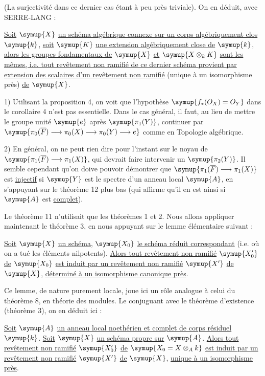 (La surjectivité dans ce dernier cas étant à peu près triviale). On en déduit,
avec SERRE-LANG :

 \uline{Soit} $\symup{X}$ \uline{un schéma algébrique connexe sur un corps
algébriquement clos} $\symup{k}$, \uline{soit} $\symup{K}$ \uline{une extension algébriquement close de} $\symup{k}$,
\uline{alors les groupes fondamentaux de} $\symup{X}$ \uline{et} $\symup{X\otimes_kK}$ \uline{sont les mêmes, i.e.
tout revêtement non ramifié de ce dernier schéma provient par extension des
scalaires d'un revêtement non ramifié} (unique à un isomorphisme près) \uline{de} $\symup{X}$.


1) Utilisant la proposition 4, on voit que l'hypothèse
$\symup{f_*(O_X)=O_Y}$ dans le corollaire 4 n'est pas essentielle. Dans le cas
général, il faut, au lieu de mettre le groupe unité $\symup{e}$ après $\symup{\pi_1(Y)}$,
continuer par
$\symup{\pi_0(\overline F)\longrightarrow\pi_0(X)
  \longrightarrow\pi_0(Y)\longrightarrow e}$
comme en Topologie algébrique.

2) En général, on ne peut rien dire pour l'instant sur le noyau de
$\symup{\pi_1(\overline F)\longrightarrow\pi_1(X)}$, qui devrait faire intervenir un
$\symup{\pi_2(Y)}$. Il semble cependant qu'on doive pouvoir démontrer que
$\symup{\pi_1(\overline F)\longrightarrow\pi_1(X)}$ est \uline{injectif} si $\symup{Y}$ est le spectre
d'un anneau local $\symup{A}$, en s'appuyant sur le théorème 12 plus bas (qui affirme
qu'il en est ainsi si $\symup{A}$ est \uline{complet}).

Le théorème 11 n'utilisait que les théorèmes 1 et 2. Nous allons appliquer
maintenant le théorème 3, en nous appuyant sur le lemme élémentaire suivant :

 \uline{Soit} $\symup{X}$ \uline{un schéma}, $\symup{X_0}$ \uline{le schéma réduit correspondant}
(i.e. où on a tué les éléments nilpotents). \uline{Alors tout revêtement non ramifié}
$\symup{X'_0}$ \uline{de} $\symup{X_0}$ \uline{est induit par un revêtement non ramifié} $\symup{X'}$ \uline{de} $\symup{X}$,
\uline{déterminé à un isomorphisme canonique près}.

Ce lemme, de nature purement locale, joue ici un rôle analogue à celui du
théorème 8, en théorie des modules. Le conjuguant avec le théorème d'existence
(théorème 3), on en déduit ici :

 \uline{Soit} $\symup{A}$ \uline{un anneau local noethérien et complet de corps
résiduel} $\symup{k}$. \uline{Soit} $\symup{X}$ \uline{un schéma propre sur} $\symup{A}$. \uline{Alors tout revêtement non
ramifié} $\symup{X'_0}$ \uline{de} $\symup{X_0=X\otimes_A k}$ \uline{est induit par un revêtement non ramifié}
$\symup{X'}$ \uline{de} $\symup{X}$, \uline{unique à un isomorphisme près}.

